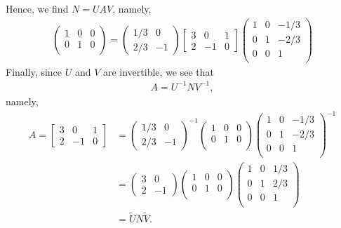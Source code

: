 \documentclass[pdf,9pt]{beamer}
\begin{document}
\begin{frame}[fragile]
\begin{solution}[Continued]
    Hence, we find $N = UAV$, namely,
    \begin{align*}
	\begin{pmatrix}
	    1 & 0 & 0\\
	    0 & 1 & 0\\
	\end{pmatrix}
	 =
	\begin{pmatrix}
	    1/3 & 0 \\
	    2/3 & -1
	\end{pmatrix}
	\begin{bmatrix}
	    3 & 0 & 1 \\
	    2 & -1 & 0
	\end{bmatrix}
	\begin{pmatrix}
	    1 & 0 & -1/3\\
	    0 & 1 & -2/3\\
	    0 & 0 & 1\\
	\end{pmatrix}
    \end{align*}
    Finally, since $U$ and $V$ are invertible, we see that
    \begin{align*}
	A = U^{-1} N V^{-1},
    \end{align*}
    namely,
    \begin{align*}
	A=
	\begin{bmatrix}
	    3 & 0 & 1 \\
	    2 & -1 & 0
	\end{bmatrix}
	 &=
	\begin{pmatrix}
	    1/3 & 0 \\
	    2/3 & -1
	\end{pmatrix}^{-1}
	\begin{pmatrix}
	    1 & 0 & 0\\
	    0 & 1 & 0\\
	\end{pmatrix}
	\begin{pmatrix}
	    1 & 0 & -1/3\\
	    0 & 1 & -2/3\\
	    0 & 0 & 1\\
	\end{pmatrix}^{-1}\\
	 &=\begin{pmatrix}
	    3 & 0 \\
	    2 & -1
	\end{pmatrix}
	\begin{pmatrix}
	    1 & 0 & 0\\
	    0 & 1 & 0\\
	\end{pmatrix}
	\begin{pmatrix}
	    1 & 0 & 1/3\\
	    0 & 1 & 2/3\\
	    0 & 0 & 1\\
	\end{pmatrix}\\
	 &=
	 \widetilde{U} N \widetilde{V}.
    \end{align*}
    \myQED
\end{solution}
\end{frame}
\end{document}
